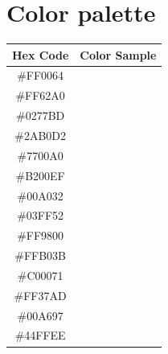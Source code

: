 \section{Color palette}
\begin{table}[h]
    \centering
    \renewcommand{\arraystretch}{1.5} %
    \setlength{\tabcolsep}{12pt} %
    \begin{tabular}{c c}
        \toprule
        \textbf{Hex Code} & \textbf{Color Sample} \\
        \midrule


        \#FF0064 & \cellcolor[HTML]{FF0064} \hspace{2cm} \\
        \#FF62A0 & \cellcolor[HTML]{FF62A0} \hspace{2cm} \\
        \#0277BD & \cellcolor[HTML]{0277BD} \hspace{2cm} \\
        \#2AB0D2 & \cellcolor[HTML]{2AB0D2} \hspace{2cm} \\
        \#7700A0 & \cellcolor[HTML]{7700A0} \hspace{2cm} \\
        \#B200EF & \cellcolor[HTML]{B200EF} \hspace{2cm} \\
        \#00A032 & \cellcolor[HTML]{00A032} \hspace{2cm} \\
        \#03FF52 & \cellcolor[HTML]{03FF52} \hspace{2cm} \\
        \#FF9800 & \cellcolor[HTML]{FF9800} \hspace{2cm} \\
        \#FFB03B & \cellcolor[HTML]{FFB03B} \hspace{2cm} \\
        \#C00071 & \cellcolor[HTML]{C00071} \hspace{2cm} \\
        \#FF37AD & \cellcolor[HTML]{FF37AD} \hspace{2cm} \\
        \#00A697 & \cellcolor[HTML]{00A697} \hspace{2cm} \\
        \#44FFEE & \cellcolor[HTML]{44FFEE} \hspace{2cm} \\
        





\end{tabular}
\end{table}
